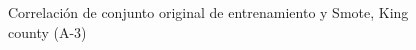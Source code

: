 \begin{figure}[H]
    \centering
    
    \caption{Correlación de conjunto original de entrenamiento y Smote, King county (A-3)}
    \label{pairwise-king county-a-3-smote-enc}
\end{figure}